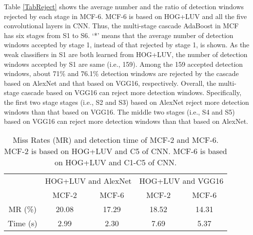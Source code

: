 \documentclass[journal]{IEEEtran}
\begin{document}
Table \ref{TabReject} shows the average number and the ratio of detection windows rejected by each stage in MCF-6. MCF-6 is based on HOG+LUV and all the five convolutional layers in CNN. Thus, the multi-stage cascade AdaBoost in MCF has six stages from S1 to S6. `*' means that the average number of detection windows accepted by stage 1, instead of that rejected by stage 1, is shown. As the weak classifiers in S1 are both learned from HOG+LUV, the number of detection windows accepted by S1 are same (i.e., 159). Among the 159 accepted detection windows, about 71\% and 76.1\% detection windows are rejected by the cascade based on AlexNet and that based on VGG16, respectively. Overall, the multi-stage cascade based on VGG16 can reject more detection windows. Specifically, the first two stage stages (i.e., S2 and S3) based on AlexNet reject more detection windows than that based on VGG16. The middle two stages (i.e., S4 and S5) based on VGG16 can reject more detection windows than that based on AlexNet.

\begin{table}[!t]
\centering
\renewcommand{\arraystretch}{1.3}
\caption{Miss Rates (MR) and detection time of MCF-2 and MCF-6. MCF-2 is based on HOG+LUV and C5 of CNN. MCF-6 is based on HOG+LUV and C1-C5 of CNN.}
\begin{tabular*}{8.5cm}{@{\extracolsep{\fill}}ccccc}
\hline
 & \multicolumn{2}{c}{HOG+LUV and AlexNet} & \multicolumn{2}{c}{HOG+LUV and VGG16}  \\
\cline{2-3} \cline{4-5}
 & MCF-2& MCF-6& MCF-2& MCF-6\\
\hline
MR (\%)& 20.08& 17.29& 18.52& 14.31\\
Time (s)& 2.99& 2.30& 7.69& 5.37\\
\hline
\end{tabular*}
\label{TabSum1}
\end{table}
\end{document}
